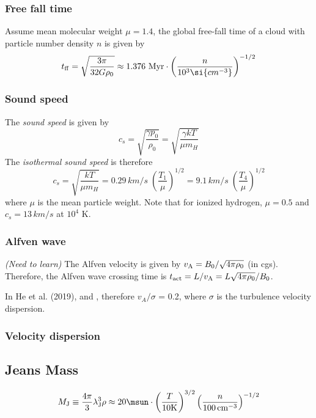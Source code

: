 \subsubsection{Free fall time}
\label{sec:org4858c4d}
Assume mean molecular weight \(\mu = 1.4\), the global free-fall time of a
cloud with particle number density \(n\) is given by $$\label{eq:ff}
t_{{\rm ff}} = \sqrt{\frac{3\pi}{32G\rho_{0}}} \approx 1.376~{\rm Myr}
\cdot \left(\frac{n}{10^3 \si{cm^{-3}}}\right)^{-1/2}$$

\subsubsection{Sound speed}
\label{sec:org9210792}
The \emph{sound speed} is given by
$$
c_{s}=\sqrt{\frac{\gamma p_{0}}{\rho_{0}}}
= \sqrt{\frac{\gamma kT}{\mu m_{H}}}
$$
The \emph{isothermal sound speed} is therefore
$$
c_s = \sqrt{\frac{kT}{\mu m_{H}}} = 0.29\,\si{km/s} \; \left( \frac{T_1}{\mu} \right)^{1/2} = 9.1\,\si{km/s} \; \left( \frac{T_4}{\mu} \right)^{1/2}
$$
where \(\mu\) is the mean particle weight. Note that for ionized hydrogen, \(\mu = 0.5\) and \(c_s = 13\,\si{km/s}\) at \(10^4\) K.

\subsubsection{Alfven wave}
\label{sec:orga1c1ac2}
\emph{(Need to learn)} The Alfven velocity is given by
\(v_{{\rm A}}=B_{0}/\sqrt{4\pi\rho_{0}}\) (in cgs). Therefore, the Alfven
wave crossing time is
\(t_{{\rm act}}=L/v_{{\rm A}}=L\sqrt{4\pi\rho_{0}}/B_{0}\).

In He et al. (2019), and , therefore \(v_A / \sigma\) = 0.2, where
\(\sigma\) is the turbulence velocity dispersion.

\subsubsection{Velocity dispersion}
\label{sec:org99846aa}

\subsection{Jeans Mass}
\label{sec:orge7b006a}
$$M_{\rm J} \equiv \frac{4\pi}{3}\lambda_{\rm J}^3 \rho
  \approx 20 \msun \cdot \left( \frac{T}{10 {\rm K}}
  \right)^{3/2} \left( \frac{n}{100\,{\rm cm}^{-3}} \right) ^{-1/2}$$


